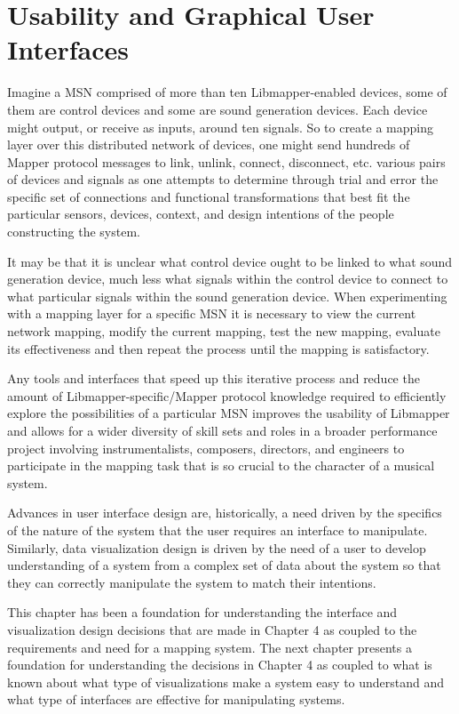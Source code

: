 \section{Usability and Graphical User Interfaces}

Imagine a MSN comprised of more than ten Libmapper-enabled devices, some of them are control devices and some are sound generation devices. Each device might output, or receive as inputs, around ten signals. So to create a mapping layer over this distributed network of devices, one might send hundreds of Mapper protocol messages to link, unlink, connect, disconnect, etc. various pairs of devices and signals as one attempts to determine through trial and error the specific set of connections and functional transformations that best fit the particular sensors, devices, context, and design intentions of the people constructing the system. 

It may be that it is unclear what control device ought to be linked to what sound generation device, much less what signals within the control device to connect to what particular signals within the sound generation device. When experimenting with a mapping layer for a specific MSN it is necessary to view the current network mapping, modify the current mapping, test the new mapping, evaluate its effectiveness and then repeat the process until the mapping is satisfactory. 

Any tools and interfaces that speed up this iterative process and reduce the amount of Libmapper-specific/Mapper protocol knowledge required to efficiently explore the possibilities of a particular MSN improves the usability of Libmapper and allows for a wider diversity of skill sets and roles in a broader performance project involving instrumentalists, composers, directors, and engineers to participate in the mapping task that is so crucial to the character of a musical system. 

Advances in user interface design are, historically, a need driven by the specifics of the nature of the system that the user requires an interface to manipulate. Similarly, data visualization design is driven by the need of a user to develop understanding of a system from a complex set of data about the system so that they can correctly manipulate the system to match their intentions. 

This chapter has been a foundation for understanding the interface and visualization design decisions that are made in Chapter 4 as coupled to the requirements and need for a mapping system. The next chapter presents a foundation for understanding the decisions in Chapter 4 as coupled to what is known about what type of visualizations make a system easy to understand and what type of interfaces are effective for manipulating systems.
